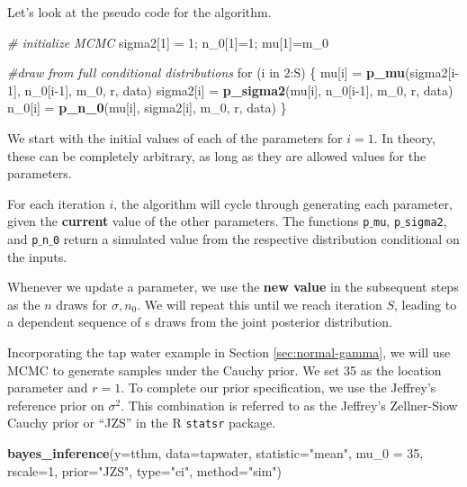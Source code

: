 \documentclass[]{book}
\newenvironment{Shaded}{\begin{snugshade}}{\end{snugshade}}
\newcommand{\KeywordTok}[1]{\textcolor[rgb]{0.13,0.29,0.53}{\textbf{{#1}}}}
\newcommand{\DataTypeTok}[1]{\textcolor[rgb]{0.13,0.29,0.53}{{#1}}}
\newcommand{\DecValTok}[1]{\textcolor[rgb]{0.00,0.00,0.81}{{#1}}}
\newcommand{\StringTok}[1]{\textcolor[rgb]{0.31,0.60,0.02}{{#1}}}
\newcommand{\CommentTok}[1]{\textcolor[rgb]{0.56,0.35,0.01}{\textit{{#1}}}}
\newcommand{\NormalTok}[1]{{#1}}
\theoremstyle{definition}
\theoremstyle{definition}
\theoremstyle{definition}
\theoremstyle{remark}
\begin{document}
Let's look at the pseudo code for the algorithm.

\begin{Shaded}
\begin{Highlighting}[]
\CommentTok{# initialize MCMC}
\NormalTok{sigma2[}\DecValTok{1}\NormalTok{] =}\StringTok{ }\DecValTok{1}\NormalTok{; n_0[}\DecValTok{1}\NormalTok{]=}\DecValTok{1}\NormalTok{; mu[}\DecValTok{1}\NormalTok{]=m_0}

\CommentTok{#draw from full conditional distributions}
\NormalTok{for (i in }\DecValTok{2}\NormalTok{:S) \{}
  \NormalTok{mu[i]     =}\StringTok{ }\KeywordTok{p_mu}\NormalTok{(sigma2[i}\DecValTok{-1}\NormalTok{], n_0[i}\DecValTok{-1}\NormalTok{],  m_0, r, data)}
  \NormalTok{sigma2[i] =}\StringTok{ }\KeywordTok{p_sigma2}\NormalTok{(mu[i], n_0[i}\DecValTok{-1}\NormalTok{],    m_0, r, data)}
  \NormalTok{n_0[i]    =}\StringTok{ }\KeywordTok{p_n_0}\NormalTok{(mu[i], sigma2[i],      m_0, r, data)}
\NormalTok{\}}
\end{Highlighting}
\end{Shaded}

We start with the initial values of each of the parameters for \(i=1\).
In theory, these can be completely arbitrary, as long as they are
allowed values for the parameters.

For each iteration \(i\), the algorithm will cycle through generating
each parameter, given the \textbf{current} value of the other
parameters. The functions \texttt{p$\_$mu}, \texttt{p$\_$sigma2}, and
\texttt{p$\_$n$\_$0} return a simulated value from the respective
distribution conditional on the inputs.

Whenever we update a parameter, we use the \textbf{new value} in the
subsequent steps as the \(n\) draws for \(\sigma, n_0\). We will repeat
this until we reach iteration \(S\), leading to a dependent sequence of
s draws from the joint posterior distribution.

Incorporating the tap water example in Section \ref{sec:normal-gamma},
we will use MCMC to generate samples under the Cauchy prior. We set 35
as the location parameter and \(r=1\). To complete our prior
specification, we use the Jeffrey's reference prior on \(\sigma^2\).
This combination is referred to as the Jeffrey's Zellner-Siow Cauchy
prior or ``JZS'' in the R \texttt{statsr} package.

\begin{Shaded}
\begin{Highlighting}[]
\KeywordTok{bayes_inference}\NormalTok{(}\DataTypeTok{y=}\NormalTok{tthm, }\DataTypeTok{data=}\NormalTok{tapwater, }\DataTypeTok{statistic=}\StringTok{"mean"}\NormalTok{,}
                \DataTypeTok{mu_0 =} \DecValTok{35}\NormalTok{, }\DataTypeTok{rscale=}\DecValTok{1}\NormalTok{, }\DataTypeTok{prior=}\StringTok{"JZS"}\NormalTok{,}
                \DataTypeTok{type=}\StringTok{"ci"}\NormalTok{, }\DataTypeTok{method=}\StringTok{"sim"}\NormalTok{)}
\end{Highlighting}
\end{Shaded}
\end{document}
